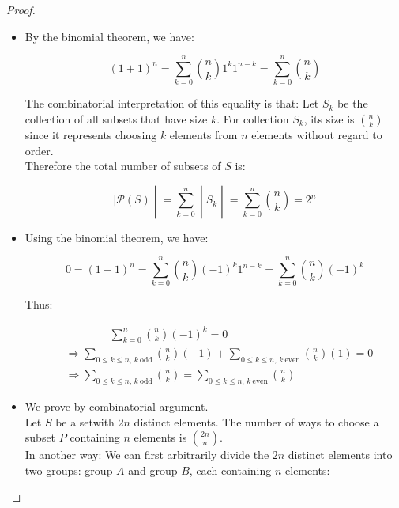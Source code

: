 \begin{proof}

\begin{itemize}
\item
  By the binomial theorem, we have:

  \[(1 + 1)^{\mathit{n}} = \sum\limits_{\mathit{k} = 0}^{\mathit{n}}\binom{\mathit{n}}{\mathit{k}}1^{\mathit{k}}1^{\mathit{n} - \mathit{k}} = \sum\limits_{\mathit{k} = 0}^{\mathit{n}}\binom{\mathit{n}}{\mathit{k}}\]

  The combinatorial interpretation of this equality is that: Let \(\mathit{S}_{\mathit{k}}\) be the collection of all subsets that have size \(\mathit{k}\). For collection \(\mathit{S}_{\mathit{k}}\), its size is \(\binom{\mathit{n}}{\mathit{k}}\) since it represents choosing \(\mathit{k}\) elements from \(\mathit{n}\) elements without regard to order.\\
  Therefore the total number of subsets of \(\mathit{S}\) is:

  \[\left. |\mathcal{P}(\mathit{S}) \middle| = \sum\limits_{\mathit{k} = 0}^{\mathit{n}} \middle| \mathit{S}_{\mathit{k}} \middle| = \sum\limits_{\mathit{k} = 0}^{\mathit{n}}\binom{\mathit{n}}{\mathit{k}} = 2^{\mathit{n}} \right.\]
\item
  Using the binomial theorem, we have:

  \[0 = (1 - 1)^{\mathit{n}} = \sum\limits_{\mathit{k} = 0}^{\mathit{n}}\binom{\mathit{n}}{\mathit{k}}( - 1)^{\mathit{k}}1^{\mathit{n} - \mathit{k}} = \sum\limits_{\mathit{k} = 0}^{\mathit{n}}\binom{\mathit{n}}{\mathit{k}}( - 1)^{\mathit{k}}\]

  Thus:

  \[\begin{matrix}
   & {\quad\quad\quad\quad\sum\limits_{\mathit{k} = 0}^{\mathit{n}}\binom{\mathit{n}}{\mathit{k}}( - 1)^{\mathit{k}} = 0} \\
   & {\Longrightarrow\sum\limits_{0 \leq \mathit{k} \leq \mathit{n},\,\mathit{k}\ \text{odd}}\binom{\mathit{n}}{\mathit{k}}( - 1) + \sum\limits_{0 \leq \mathit{k} \leq \mathit{n},\,\mathit{k}\ \text{even}}\binom{\mathit{n}}{\mathit{k}}(1) = 0} \\
   & {\Longrightarrow\sum\limits_{0 \leq \mathit{k} \leq \mathit{n},\,\mathit{k}\ \text{odd}}\binom{\mathit{n}}{\mathit{k}} = \sum\limits_{0 \leq \mathit{k} \leq \mathit{n},\,\mathit{k}\ \text{even}}\binom{\mathit{n}}{\mathit{k}}}
  \end{matrix}\]
\item
  We prove by combinatorial argument.\\
  Let \(\mathit{S}\) be a setwith \(2\mathit{n}\) distinct elements. The number of ways to choose a subset \(\mathit{P}\) containing \(\mathit{n}\) elements is \(\binom{2\mathit{n}}{\mathit{n}}\).\\
  In another way: We can first arbitrarily divide the \(2\mathit{n}\) distinct elements into two groups: group \(\mathit{A}\) and group \(\mathit{B}\), each containing \(\mathit{n}\) elements:


\end{itemize}
\end{proof}
